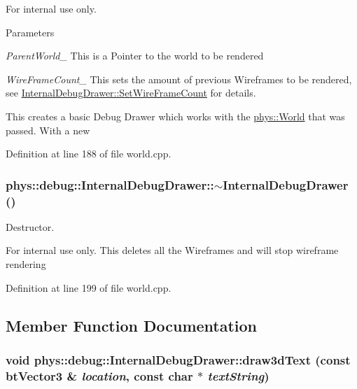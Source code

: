 \begin{DoxyInternal}{For internal use only.}

\begin{DoxyParams}{Parameters}
\item[{\em ParentWorld\_\-}]This is a Pointer to the world to be rendered \item[{\em WireFrameCount\_\-}]This sets the amount of previous Wireframes to be rendered, see \hyperlink{classphys_1_1debug_1_1InternalDebugDrawer_a76922fda7bb3b59d301e50d67e4f3c72}{InternalDebugDrawer::SetWireFrameCount} for details.\end{DoxyParams}
This creates a basic Debug Drawer which works with the \hyperlink{classphys_1_1World}{phys::World} that was passed. With a new \end{DoxyInternal}


Definition at line 188 of file world.cpp.

\hypertarget{classphys_1_1debug_1_1InternalDebugDrawer_a9b5cb5ec48541effddb305de12508323}{
\subsubsection[{$\sim$InternalDebugDrawer}]{\setlength{\rightskip}{0pt plus 5cm}phys::debug::InternalDebugDrawer::$\sim$InternalDebugDrawer ()}}
\label{db/d27/classphys_1_1debug_1_1InternalDebugDrawer_a9b5cb5ec48541effddb305de12508323}


Destructor. 

\begin{DoxyInternal}{For internal use only.}
This deletes all the Wireframes and will stop wireframe rendering \end{DoxyInternal}


Definition at line 199 of file world.cpp.



\subsection{Member Function Documentation}
\hypertarget{classphys_1_1debug_1_1InternalDebugDrawer_a1266d3fad8868ade2d515e9c92e76b4a}{
\subsubsection[{draw3dText}]{\setlength{\rightskip}{0pt plus 5cm}void phys::debug::InternalDebugDrawer::draw3dText (const btVector3 \& {\em location}, \/  const char $\ast$ {\em textString})}}
\label{db/d27/classphys_1_1debug_1_1InternalDebugDrawer_a1266d3fad8868ade2d515e9c92e76b4a}


